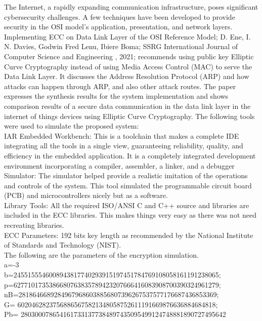 \documentclass[12pt]{article}
\begin{document}
The  Internet, a  rapidly expanding  communication infrastructure,  poses  significant  cybersecurity  challenges. A few techniques have been developed to provide security in the OSI model's application, presentation, and network layers. Implementing ECC on Data Link Layer of the OSI Reference Model; D. Ene, I. N. Davies, Godwin Fred Lenu, Ibiere Boma; SSRG International Journal of Computer Science and Engineering , 2021; recommends using public key Elliptic Curve Cryptography instead of using Media Access Control (MAC) to serve the Data Link Layer. It discusses the Address Resolution Protocol (ARP) and how attacks can happen through ARP, and also other attack routes. The paper expresses  the  synthesis  results  for  the  system implementation  and  shows  comparison  results  of  a secure data communication in the data link layer in the internet of things devices using Elliptic Curve Cryptography. The following tools were used to simulate the proposed system:\\
IAR Embedded Workbench: This is a toolchain that makes a complete IDE integrating all the tools in a single view, guaranteeing reliability, quality, and efficiency in the embedded application. It is a completely integrated development environment incorporating a compiler, assembler, a linker, and a debugger\\
Simulator: The simulator helped provide a realistic imitation of the operations and controls of the system. This tool simulated the programmable circuit board (PCB) and microcontrollers nicely but as a software.\\
Library Tools: All the required ISO/ANSI C and C++ source and libraries are included in the ECC libraries. This makes things very easy as there was not need recreating libraries.\\
ECC Parameters: 192 bits key length as recommended by the National Institute of Standards and Technology (NIST).\\
The following are the parameters of the encryption simulation.\\
a=-3\\
b=2455155546008943817740293915197451784769108058161191238065;\\
p=6277101735386680763835789423207666416083908700390324961279;\\
nB=28186466892849679686038856807396267537577176687436853369;\\
G= {60204628237568865675821348058752611191669876636884684818};\\
Pb= {2803000786541617331377384897435095499124748881890727495642}\\
\end{document}
